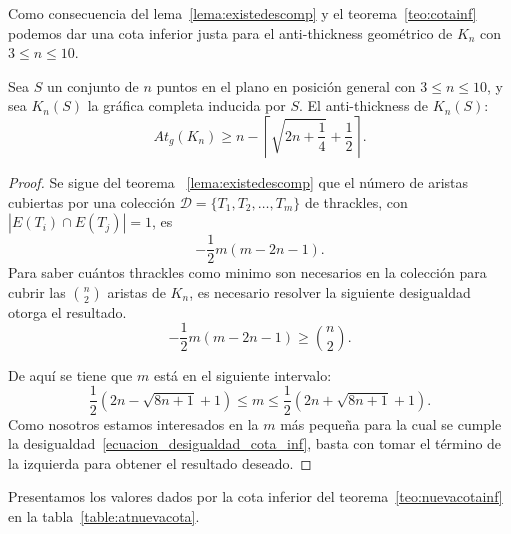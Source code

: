 Como consecuencia del lema~\ref{lema:existedescomp} y el teorema~\ref{teo:cotainf} podemos dar una cota inferior justa para el anti-thickness geométrico de $K_n$ con $3 \leq n \leq 10$.

\begin{theorem}\label{teo:nuevacotainf}
  Sea $S$ un conjunto de $n$ puntos en el plano en posición general con $3\leq n \leq 10$, y sea $K_n(S)$ la gráfica completa inducida por $S$. El anti-thickness de $K_n(S)$:
  \begin{equation}
    At_g(K_n) \geq n - \left\lceil\sqrt{2n+\frac{1}{4}} + \frac{1}{2}\right\rceil.
    \label{ecuacion_cota_inf}
  \end{equation}
\end{theorem}
\begin{proof}
  Se sigue del teorema ~\ref{lema:existedescomp} que el número de aristas
  cubiertas por una colección $\mathcal{D}=\{T_1,T_2,\dots,T_m\}$ de thrackles,
  con $|E(T_i)\cap E(T_j)| = 1$, es
  \[ -\frac{1}{2}m(m-2n-1). \]
  Para saber cuántos thrackles como minimo son necesarios en la colección para
  cubrir las $\binom{n}{2}$ aristas de $K_n$, es necesario resolver la
  siguiente desigualdad otorga el resultado.
  \begin{equation}
     -\frac{1}{2}m(m-2n-1) \geq \binom{n}{2}.
     \label{ecuacion_desigualdad_cota_inf}
  \end{equation}

  De aquí se tiene que $m$ está en el siguiente intervalo:
  \[
    \frac{1}{2}\left(2n-\sqrt{8n+1} + 1\right) \leq m \leq  \frac{1}{2}\left(2n+\sqrt{8n+1} + 1\right).
  \]
  Como nosotros estamos interesados en la $m$ más pequeña para la cual se cumple la desigualdad~\ref{ecuacion_desigualdad_cota_inf}, basta con tomar el término de la izquierda para obtener el resultado deseado.
\end{proof}
  Presentamos los valores dados por la cota inferior del
  teorema~\ref{teo:nuevacotainf} en la tabla~\ref{table:atnuevacota}.
